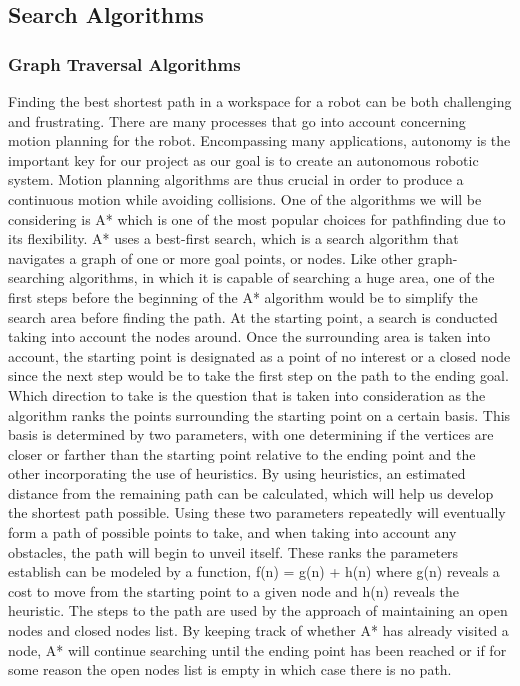 \documentclass[titlepage]{article}
\begin{document}
\subsection{Search Algorithms}
\subsubsection{Graph Traversal Algorithms}
Finding the best shortest path in a workspace for a robot can be both challenging and frustrating. There are many processes that go into account concerning motion planning for the robot. Encompassing many applications, autonomy is the important key for our project as our goal is to create an autonomous robotic system. Motion planning algorithms are thus crucial in order to produce a continuous motion while avoiding collisions. One of the algorithms we will be considering is A* which is one of the most popular choices for pathfinding due to its flexibility. A* uses a best-first search, which is a search algorithm that navigates a graph of one or more goal points, or nodes. Like other graph-searching algorithms, in which it is capable of searching a huge area, one of the first steps before the beginning of the A* algorithm would be to simplify the search area before finding the path. At the starting point, a search is conducted taking into account the nodes around. Once the surrounding area is taken into account, the starting point is designated as a point of no interest or a closed node since the next step would be to take the first step on the path to the ending goal.
Which direction to take is the question that is taken into consideration as the algorithm ranks the points surrounding the starting point on a certain basis. This basis is determined by two parameters, with one determining if the vertices are closer or farther than the starting point relative to the ending point and the other incorporating the use of heuristics. By using heuristics, an estimated distance from the remaining path can be calculated, which will help us develop the shortest path possible. Using these two parameters repeatedly will eventually form a path of possible points to take, and when taking into account any obstacles, the path will begin to unveil itself. These ranks the parameters establish can be modeled by a function, f(n) = g(n) + h(n) where g(n) reveals a cost to move from the starting point to a given node and h(n) reveals the heuristic. The steps to the path are used by the approach of maintaining an open nodes and closed nodes list. By keeping track of whether A* has already visited a node, A* will continue searching until the ending point has been reached or if for some reason the open nodes list is empty in which case there is no path.
\end{document}
